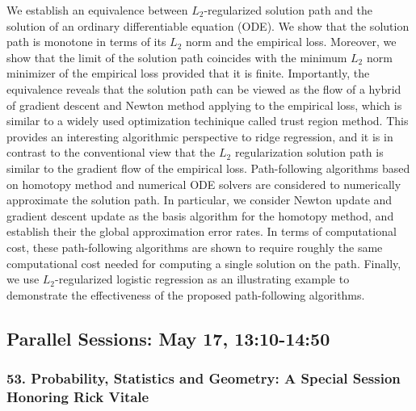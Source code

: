 \begin{itemize}
We establish an equivalence between $L_2$-regularized solution path and the solution of an ordinary differentiable equation (ODE). We show that the solution path is monotone in terms of its $L_2$ norm and the empirical loss. Moreover, we show that the limit of the solution path coincides with the minimum $L_2$ norm minimizer of the empirical loss provided that it is finite. Importantly, the equivalence reveals that the solution path can be viewed as the flow of a hybrid of gradient descent and Newton method applying to the empirical loss, which is similar to a widely used optimization techinique called trust region method. This provides an interesting algorithmic perspective to ridge regression, and it is in contrast to the conventional view that the $L_2$ regularization solution path is similar to the gradient flow of the empirical loss. Path-following algorithms based on homotopy method and numerical ODE solvers are considered to numerically approximate the solution path. In particular, we consider Newton update and gradient descent update as the basis algorithm for the homotopy method, and establish their the global approximation error rates. In terms of computational cost, these path-following algorithms are shown to require roughly the same computational cost needed for computing a single solution on the path. Finally, we use $L_2$-regularized logistic regression as an illustrating example to demonstrate the effectiveness of the proposed path-following algorithms.

\end{itemize}

\subsection*{Parallel Sessions: May 17, 13:10-14:50}

\subsubsection*{53. Probability, Statistics and Geometry: A Special Session Honoring Rick Vitale}

